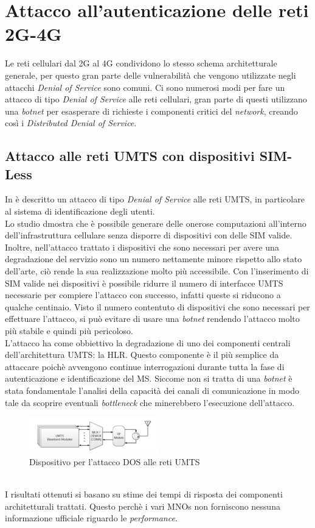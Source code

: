 \section{Attacco all'autenticazione delle reti 2G-4G}
Le reti cellulari dal 2G al 4G condividono lo stesso schema architetturale generale, per questo gran parte delle vulnerabilità che vengono
utilizzate negli attacchi \textit{Denial of Service} sono comuni.
Ci sono numerosi modi per fare un attacco di tipo \textit{Denial of Service} alle reti cellulari, gran parte di questi utilizzano
una \textit{botnet} per esasperare di richieste i componenti critici del \textit{network}, creando così i \textit{Distributed Denial of Service}.\\

\subsection{Attacco alle reti UMTS con dispositivi SIM-Less}
In \cite{umts-dos} è descritto un attacco di tipo \textit{Denial of Service} alle reti UMTS, in particolare al
sistema di identificazione degli utenti. \\
Lo studio dmostra che è possibile generare delle onerose computazioni all'interno dell'infrastruttura cellulare senza 
disporre di dispositivi con delle SIM valide. Inoltre, nell'attacco trattato i dispositivi che sono necessari per avere una 
degradazione del servizio sono un numero nettamente minore rispetto allo stato dell'arte, ciò rende la sua realizzazione molto
più accessibile. Con l'inserimento di SIM valide nei dispositivi è possibile ridurre il numero di interfacce UMTS necessarie per compiere 
l'attacco con successo, infatti queste si riducono a qualche centinaio.
Visto il numero contentuto di dispositivi che sono necessari per effettuare l'attacco, si può evitare di usare una \textit{botnet} rendendo l'attacco
molto più stabile e quindi più pericoloso.\\
L'attacco ha come obbiettivo la degradazione di uno dei componenti centrali dell'architettura UMTS: la HLR. Questo componente è il più semplice da 
attaccare poichè avvengono continue interrogazioni durante tutta la fase di autenticazione e identificazione del MS.
Siccome non si tratta di una \textit{botnet} è stata fondamentale l'analisi della capacità dei canali di comunicazione in modo tale da scoprire eventuali
\textit{bottleneck} che minerebbero l'esecuzione dell'attacco.
\begin{figure}[h]
    \centering
    \includegraphics[width=0.5\textwidth]{images/umts-dos-device.png}
    \caption{Dispositivo per l'attacco DOS alle reti UMTS\cite{umts-dos}}
\end{figure}\\
I risultati ottenuti si basano su stime dei tempi di risposta dei componenti architetturali trattati. Questo perchè i vari MNOs non forniscono nessuna 
informazione ufficiale riguardo le \textit{performance}.
